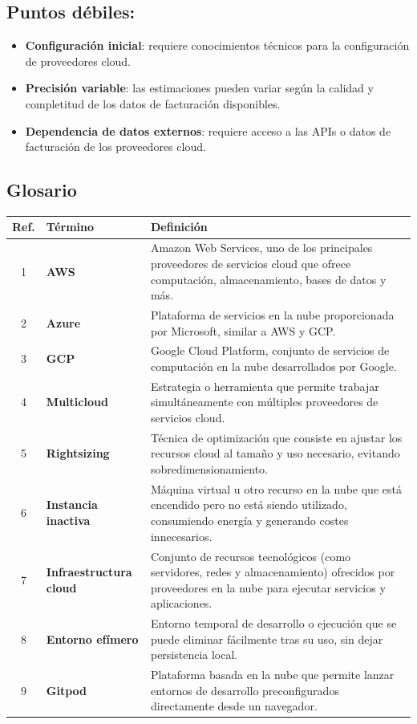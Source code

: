 \documentclass[12pt,a4paper]{report}
\begin{document}
\subsection*{Puntos débiles:}

\begin{itemize}
  \item \textbf{Configuración inicial}: requiere conocimientos técnicos para la configuración de proveedores cloud.
  \item \textbf{Precisión variable}: las estimaciones pueden variar según la calidad y completitud de los datos de facturación disponibles.
  \item \textbf{Dependencia de datos externos}: requiere acceso a las APIs o datos de facturación de los proveedores cloud.
\end{itemize}

\subsection*{Glosario}

\begin{table}[h]
\centering
\begin{tabular}{@{}cll@{}}
\toprule
\textbf{Ref.} & \textbf{Término} & \textbf{Definición} \\
\midrule
1 & \textbf{AWS} & Amazon Web Services, uno de los principales proveedores de servicios cloud que ofrece computación, almacenamiento, bases de datos y más. \\
2 & \textbf{Azure} & Plataforma de servicios en la nube proporcionada por Microsoft, similar a AWS y GCP. \\
3 & \textbf{GCP} & Google Cloud Platform, conjunto de servicios de computación en la nube desarrollados por Google. \\
4 & \textbf{Multicloud} & Estrategia o herramienta que permite trabajar simultáneamente con múltiples proveedores de servicios cloud. \\
5 & \textbf{Rightsizing} & Técnica de optimización que consiste en ajustar los recursos cloud al tamaño y uso necesario, evitando sobredimensionamiento. \\
6 & \textbf{Instancia inactiva} & Máquina virtual u otro recurso en la nube que está encendido pero no está siendo utilizado, consumiendo energía y generando costes innecesarios. \\
7 & \textbf{Infraestructura cloud} & Conjunto de recursos tecnológicos (como servidores, redes y almacenamiento) ofrecidos por proveedores en la nube para ejecutar servicios y aplicaciones. \\
8 & \textbf{Entorno efímero} & Entorno temporal de desarrollo o ejecución que se puede eliminar fácilmente tras su uso, sin dejar persistencia local. \\
9 & \textbf{Gitpod} & Plataforma basada en la nube que permite lanzar entornos de desarrollo preconfigurados directamente desde un navegador. \\
\bottomrule
\end{tabular}
\end{table}
\end{document}
